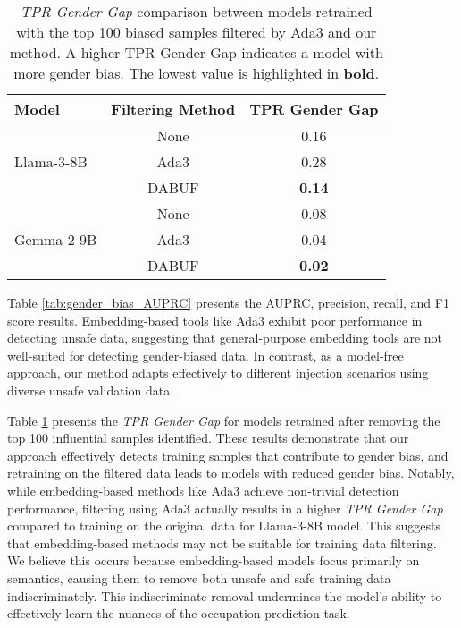 \documentclass[11pt]{article}
\begin{document}
\begin{table}[ht]
\small
\centering
\caption{\textit{TPR Gender Gap} comparison between models retrained with the top 100 biased samples filtered by Ada3 and our method. A higher TPR Gender Gap indicates a model with more gender bias. The lowest value is highlighted in \textbf{bold}.}
\begin{tabular}{lcc}
\toprule
Model  & Filtering Method  & TPR Gender Gap \\ 
\midrule
\multirow{3}{*}{Llama-3-8B} & None & 0.16 \\
 & Ada3  & 0.28  \\
 & DABUF & \textbf{0.14}   \\ 
 \midrule
 \multirow{3}{*}{Gemma-2-9B} & None & 0.08 \\
 & Ada3  &  0.04  \\
 & DABUF & \textbf{0.02}   \\ 
\bottomrule
\end{tabular}
\label{tab:retrain_Gap_gender}
\end{table}

Table \ref{tab:gender_bias_AUPRC} presents the AUPRC, precision, recall, and F1 score results. Embedding-based tools like Ada3 exhibit poor performance in detecting unsafe data, suggesting that general-purpose embedding tools are not well-suited for detecting gender-biased data.
In contrast, as a model-free approach, our method adapts effectively to different injection scenarios using diverse unsafe validation data. 

Table \ref{tab:retrain_Gap_gender} presents the \textit{TPR Gender Gap} for models retrained after removing the top 100 influential samples identified. These results demonstrate that our approach effectively detects training samples that contribute to gender bias, and retraining on the filtered data leads to models with reduced gender bias. Notably, while embedding-based methods like Ada3 achieve non-trivial detection performance, filtering using Ada3 actually results in a higher \textit{TPR Gender Gap} compared to training on the original data for Llama-3-8B model. This suggests that embedding-based methods may not be suitable for training data filtering. We believe this occurs because embedding-based models focus primarily on semantics, causing them to remove both unsafe and safe training data indiscriminately. This indiscriminate removal undermines the model’s ability to effectively learn the nuances of the occupation prediction task.
\end{document}
